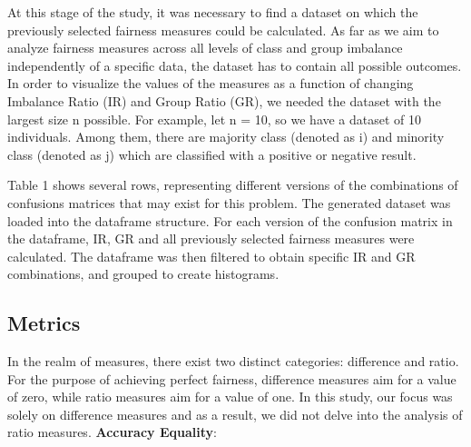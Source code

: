 \documentclass[a4paper, 12pt]{article}
\begin{document}
At this stage of the study, it was necessary to find a dataset on which the previously selected fairness measures could be calculated. As far as we aim to analyze fairness measures across all levels of class and group imbalance independently of a specific data, the dataset has to contain all possible outcomes. In order to visualize the values of the measures as a function of changing Imbalance Ratio (IR) and Group Ratio (GR), we needed the dataset with the largest size n possible. For example, let n = 10, so we have a dataset of 10 individuals. Among them, there are majority class (denoted as i) and minority class (denoted as j) which are classified with a positive or negative result. 

Table 1 shows several rows, representing different versions of the combinations of confusions matrices that may exist for this problem. The generated dataset was loaded into the dataframe structure. For each version of the confusion matrix in the dataframe, IR, GR and all previously selected fairness measures were calculated. The dataframe was then filtered to obtain specific IR and GR combinations, and grouped to create histograms.

\clearpage
\begin{table}[!h]
\caption{Dataset snippet}
\end{table}

\subsection{Metrics}

In the realm of measures, there exist two distinct categories: difference and ratio. For the purpose of achieving perfect fairness, difference measures aim for a value of zero, while ratio measures aim for a value of one. In this study, our focus was solely on difference measures and as a result, we did not delve into the analysis of ratio measures.
\bigbreak
\textbf{Accuracy Equality}:
\end{document}
